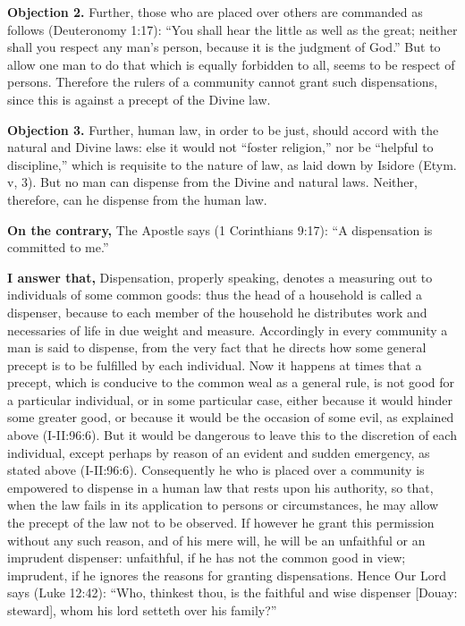 \textbf{Objection 2.} Further, those who are placed over others are commanded as follows (Deuteronomy 1:17): ``You shall hear the little as well as the great; neither shall you respect any man's person, because it is the judgment of God.'' But to allow one man to do that which is equally forbidden to all, seems to be respect of persons. Therefore the rulers of a community cannot grant such dispensations, since this is against a precept of the Divine law.

\textbf{Objection 3.} Further, human law, in order to be just, should accord with the natural and Divine laws: else it would not ``foster religion,'' nor be ``helpful to discipline,'' which is requisite to the nature of law, as laid down by Isidore (Etym. v, 3). But no man can dispense from the Divine and natural laws. Neither, therefore, can he dispense from the human law.

\textbf{On the contrary,} The Apostle says (1 Corinthians 9:17): ``A dispensation is committed to me.''

\textbf{I answer that,} Dispensation, properly speaking, denotes a measuring out to individuals of some common goods: thus the head of a household is called a dispenser, because to each member of the household he distributes work and necessaries of life in due weight and measure. Accordingly in every community a man is said to dispense, from the very fact that he directs how some general precept is to be fulfilled by each individual. Now it happens at times that a precept, which is conducive to the common weal as a general rule, is not good for a particular individual, or in some particular case, either because it would hinder some greater good, or because it would be the occasion of some evil, as explained above (I-II:96:6). But it would be dangerous to leave this to the discretion of each individual, except perhaps by reason of an evident and sudden emergency, as stated above (I-II:96:6). Consequently he who is placed over a community is empowered to dispense in a human law that rests upon his authority, so that, when the law fails in its application to persons or circumstances, he may allow the precept of the law not to be observed. If however he grant this permission without any such reason, and of his mere will, he will be an unfaithful or an imprudent dispenser: unfaithful, if he has not the common good in view; imprudent, if he ignores the reasons for granting dispensations. Hence Our Lord says (Luke 12:42): ``Who, thinkest thou, is the faithful and wise dispenser [Douay: steward], whom his lord setteth over his family?''

